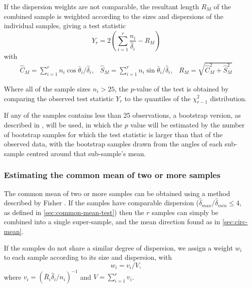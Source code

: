 \documentclass[../../ArchStats.tex]{subfiles}
\begin{document}
If the dispersion weights are not comparable, the resultant length $R_M$ of the combined sample is weighted according to the sizes and dispersions of the individual samples, giving a test statistic
\[Y_r = 2\left(\sum_{i=1}^r \frac{n_i}{\hat{\delta}_i} - R_M\right)\]
with 
\[\begin{matrix*}
\hat{C}_M = \sum_{i=1}^r n_i \cos \bar{\theta}_i / \hat{\delta}_i, &
\hat{S}_M = \sum_{i=1}^r n_i \sin \bar{\theta}_i / \hat{\delta}_i, &
R_M = \sqrt{\hat{C}_M^2 + \hat{S}_M^2}
\end{matrix*}\]

Where all of the sample sizes $n_i > 25$, the $p$-value of the test is obtained by comparing the observed test statistic $Y_r$ to the quantiles of the $\chi^2_{r-1}$ distribution. 

If any of the samples contains less than 25 observations, a bootstrap version, as described in \cite[section 8.4.4]{Fisher1993}, will be used, in which the $p$ value will be estimated by the number of bootstrap samples for which the test statistic is larger than that of the observed data, with the bootstrap samples drawn from the angles of each sub-sample centred around that sub-sample's mean. 


\subsubsection{Estimating the common mean of two or more samples}
\label{sec:est-pooled-mean}

The common mean of two or more samples can be obtained using a method described by Fisher \cite[section5.3.5]{Fisher1993}. If the samples have comparable dispersion ($\hat{\delta}_{max} / \hat{\delta}_{min} \leq 4$, as defined in \ref{sec:common-mean-test}) then the $r$ samples can simply be combined into a single super-sample, and the mean direction found as in \ref{sec:circ-mean}.

If the samples do not share a similar degree of dispersion, we assign a weight $w_i$ to each sample according to its size and dispersion, with
\[w_i = v_i/V,\]
where $v_i = (\bar{R}_i \hat{\delta}_i / n_i)^{-1}$ and $V = \sum_{i=1}^r v_i$.
\end{document}
